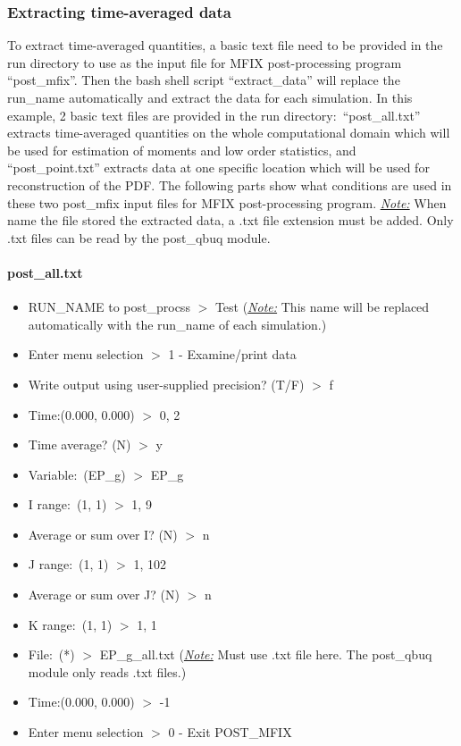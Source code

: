 \documentclass[a4paper,12pt,titlepage]{article}
\begin{document}
\subsubsection{Extracting time-averaged data}
\label{sec:ExtractData}

To extract time-averaged quantities, a basic text file need to be provided in 
the run directory to use as the input file for MFIX post-processing program
``post\_mfix''. Then the bash shell script ``extract\_data'' will replace the 
run\_name automatically and extract the data for each simulation. In this
example, 2 basic text files are provided in the run directory:\ 
``post\_all.txt'' extracts time-averaged quantities on the whole computational
domain which will be used for estimation of moments and low order statistics, 
and \\``post\_point.txt'' extracts data at one specific location which will be 
used for reconstruction of the PDF. The following parts show what conditions are 
used in these two post\_mfix input files for MFIX post-processing program. 
\emph{\underline{Note:}} When name the file stored the extracted data, a .txt 
file extension must be added. Only .txt files can be read by the post\_qbuq 
module.

\paragraph*{post\_all.txt}

\begin{itemize}
 \item RUN\_NAME to post\_procss $>$ Test (\emph{\underline{Note:}} This name 
 will be replaced automatically with the run\_name of each simulation.)
 \item Enter menu selection $>$ 1 - Examine/print data
 \item Write output using user-supplied precision? (T/F) $>$ f
 \item Time:(0.000, 0.000) $>$ 0, 2
 \item Time average? (N) $>$ y
 \item Variable:\ (EP\_g) $>$ EP\_g
 \item I range:\ (1, 1) $>$ 1, 9
 \item Average or sum over I? (N) $>$ n
 \item J range:\ (1, 1) $>$ 1, 102
 \item Average or sum over J? (N)  $>$ n
 \item K range:\ (1, 1) $>$ 1, 1
 \item File:\ (*) $>$ EP\_g\_all.txt (\emph{\underline{Note:}} Must use .txt 
 file here. The post\_qbuq module only reads .txt files.)
 \item Time:(0.000, 0.000) $>$ -1
 \item Enter menu selection $>$ 0 - Exit POST\_MFIX
\end{itemize}
\end{document}
